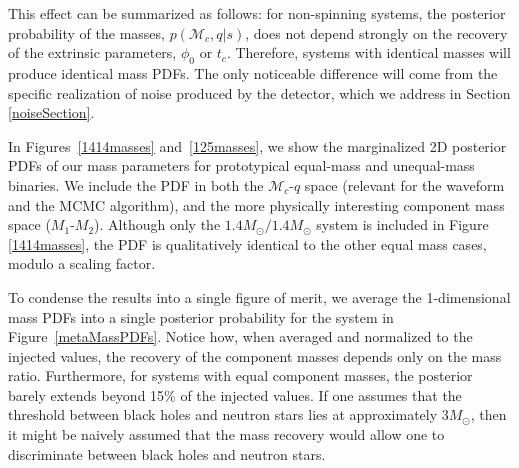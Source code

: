 \documentclass[11pt,a4paper]{emulateapj} 
\newcommand{\carl}[1]{{\color{red} #1}}
\newcommand{\chmass}{\mathcal{M}_c}
\begin{document}
This effect can be summarized as follows: for non-spinning systems,
the posterior probability of the masses, $p(\chmass, q | s)$, does not
depend strongly on the recovery of the extrinsic parameters, $\phi_0$
or $t_c$.  Therefore, systems with identical masses will produce
identical mass PDFs.  The only noticeable difference will come from
the specific realization of noise produced by the detector, which we
address in Section \ref{noiseSection}.




In Figures~\ref{1414masses} and~\ref{125masses}, we show the
marginalized 2D posterior PDFs of our mass parameters for prototypical
equal-mass and unequal-mass binaries.  We include the PDF in both the
$\chmass$-$q$ space (relevant for the waveform and the MCMC
algorithm), and the more physically interesting component mass space
($M_1$-$M_2$).  Although only the $1.4M_{\odot}/1.4M_{\odot}$ system
is included in Figure \ref{1414masses}, the PDF is qualitatively
identical to the other equal mass cases, modulo a scaling factor.

To condense the results into a single figure of merit, we average the
1-dimensional mass PDFs into a single posterior probability for the
system in Figure~\ref{metaMassPDFs}.  Notice how, when averaged and
normalized to the injected values, the recovery of the component
masses depends only on the mass ratio.  Furthermore, for systems with
equal component masses, the posterior barely extends beyond 15\% of
the injected values.  If one assumes that the threshold between black
holes and neutron stars lies at approximately $3M_{\odot}$, then it
might be naively assumed that the mass recovery would allow one to
discriminate between black holes and neutron stars.
   
\end{document}
